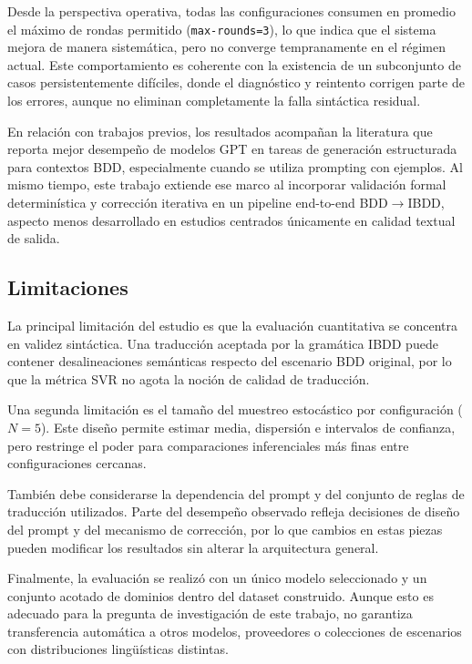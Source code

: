 Desde la perspectiva operativa, todas las configuraciones consumen en promedio el máximo de rondas permitido (\texttt{max-rounds=3}), lo que indica que el sistema mejora de manera sistemática, pero no converge tempranamente en el régimen actual. Este comportamiento es coherente con la existencia de un subconjunto de casos persistentemente difíciles, donde el diagnóstico y reintento corrigen parte de los errores, aunque no eliminan completamente la falla sintáctica residual.

En relación con trabajos previos, los resultados acompañan la literatura que reporta mejor desempeño de modelos GPT en tareas de generación estructurada para contextos BDD, especialmente cuando se utiliza prompting con ejemplos. Al mismo tiempo, este trabajo extiende ese marco al incorporar validación formal determinística y corrección iterativa en un pipeline end-to-end BDD$\rightarrow$IBDD, aspecto menos desarrollado en estudios centrados únicamente en calidad textual de salida.

\subsection{Limitaciones}

La principal limitación del estudio es que la evaluación cuantitativa se concentra en validez sintáctica. Una traducción aceptada por la gramática IBDD puede contener desalineaciones semánticas respecto del escenario BDD original, por lo que la métrica SVR no agota la noción de calidad de traducción.

Una segunda limitación es el tamaño del muestreo estocástico por configuración ($N=5$). Este diseño permite estimar media, dispersión e intervalos de confianza, pero restringe el poder para comparaciones inferenciales más finas entre configuraciones cercanas.

También debe considerarse la dependencia del prompt y del conjunto de reglas de traducción utilizados. Parte del desempeño observado refleja decisiones de diseño del prompt y del mecanismo de corrección, por lo que cambios en estas piezas pueden modificar los resultados sin alterar la arquitectura general.

Finalmente, la evaluación se realizó con un único modelo seleccionado y un conjunto acotado de dominios dentro del dataset construido. Aunque esto es adecuado para la pregunta de investigación de este trabajo, no garantiza transferencia automática a otros modelos, proveedores o colecciones de escenarios con distribuciones lingüísticas distintas.

